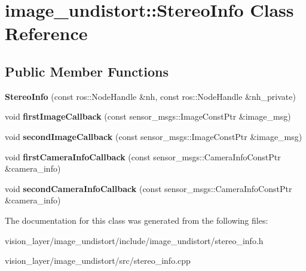 \hypertarget{classimage__undistort_1_1StereoInfo}{}\section{image\+\_\+undistort\+:\+:Stereo\+Info Class Reference}
\label{classimage__undistort_1_1StereoInfo}
\subsection*{Public Member Functions}
\begin{DoxyCompactItemize}
\item 
\mbox{\label{classimage__undistort_1_1StereoInfo_a62fe2530de49425feb14e31c919829a1}} 
{\bfseries Stereo\+Info} (const ros\+::\+Node\+Handle \&nh, const ros\+::\+Node\+Handle \&nh\+\_\+private)
\item 
\mbox{\label{classimage__undistort_1_1StereoInfo_a0492c68954953faed640876642beb341}} 
void {\bfseries first\+Image\+Callback} (const sensor\+\_\+msgs\+::\+Image\+Const\+Ptr \&image\+\_\+msg)
\item 
\mbox{\label{classimage__undistort_1_1StereoInfo_a63fa342a6a4889568a5b7cb2a1177e2c}} 
void {\bfseries second\+Image\+Callback} (const sensor\+\_\+msgs\+::\+Image\+Const\+Ptr \&image\+\_\+msg)
\item 
\mbox{\label{classimage__undistort_1_1StereoInfo_adcd2c1d11c7ab55f689de1f785490721}} 
void {\bfseries first\+Camera\+Info\+Callback} (const sensor\+\_\+msgs\+::\+Camera\+Info\+Const\+Ptr \&camera\+\_\+info)
\item 
\mbox{\label{classimage__undistort_1_1StereoInfo_a692996ab79c0b27d7c747b65d3f13bba}} 
void {\bfseries second\+Camera\+Info\+Callback} (const sensor\+\_\+msgs\+::\+Camera\+Info\+Const\+Ptr \&camera\+\_\+info)
\end{DoxyCompactItemize}


The documentation for this class was generated from the following files\+:\begin{DoxyCompactItemize}
\item 
vision\+\_\+layer/image\+\_\+undistort/include/image\+\_\+undistort/stereo\+\_\+info.\+h\item 
vision\+\_\+layer/image\+\_\+undistort/src/stereo\+\_\+info.\+cpp\end{DoxyCompactItemize}
